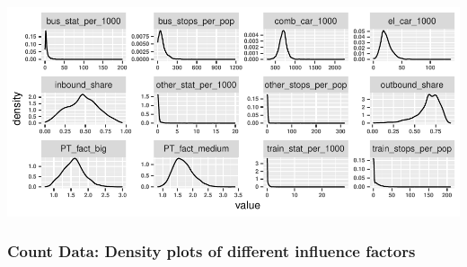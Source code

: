 \documentclass[
]{article}
\begin{document}
\includegraphics{Influence_factors_files/figure-latex/1.07_density_plots1-4.pdf}

\hypertarget{count-data-density-plots-of-different-influence-factors}{%
\subsubsection{Count Data: Density plots of different influence
factors}\label{count-data-density-plots-of-different-influence-factors}}
\end{document}
